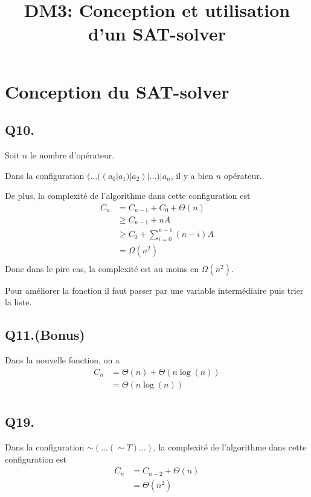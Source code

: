 

\title{DM3: Conception et utilisation d’un SAT-solver}
\author{}
\date{}


    \maketitle
    \section{Conception du SAT-solver}
    \subsection*{Q10.}
    Soit $n$ le nombre d'opérateur.
    
    Dans la configuration $(...((a_0 | a_1) | a_2) | ...) | a_n$,
    il y a bien $n$ opérateur.
    
    De plus, la complexité de l'algorithme dans cette configuration est
    \begin{align*}
        C_n &= C_{n-1} + C_0 + \Theta(n)\\
        &\geq C_{n-1} + nA\\
        &\geq C_0 + \sum_{i=0}^{n-1}(n-i)A\\
        &= \Omega(n^2)\\
    \end{align*}
    Donc dans le pire cas, la complexité est au moins en $\Omega(n^2)$.
    
    Pour améliorer la fonction
    il faut passer par une variable intermédiaire puis trier la liste.
    
    \subsection*{Q11.(Bonus)}
    Dans la nouvelle fonction, on a
    \begin{align*}
        C_n &= \Theta(n) + \Theta(n\log(n))\\
        &= \Theta(n\log(n))\\
    \end{align*}
    
    \subsection*{Q19.}
    Dans la configuration $\sim(...(\sim T)...)$, 
    la complexité de l'algorithme dans cette configuration est
    \begin{align*}
        C_n &= C_{n-2} + \Theta(n)\\
        &= \Theta(n^2)
    \end{align*}
    
